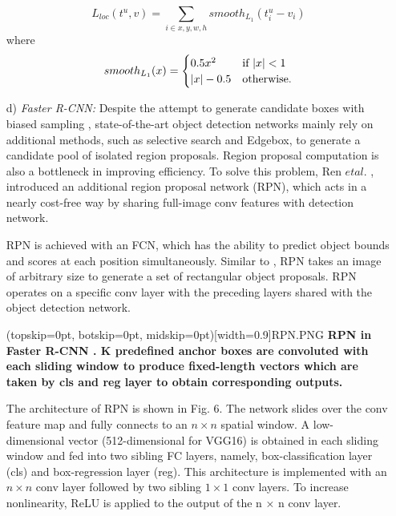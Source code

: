 \documentclass[two column]{ieeeaccess}
\begin{document}
\begin{itemize}
    \begin{equation}
    \label{eqn2}
    L_{loc}(t^u,v) = \sum_{i\in x,y,w,h} smooth_{L_1}(t^u_i - v_i)
    \end{equation}
    where
    \begin{equation}
    \label{eqn3}
    smooth_{L_1}(x) = 
        \begin{cases}
          $$ 0.5x^2 $$ & \text{if } $$ |x| < 1 $$\\
          $$ |x| - 0.5 $$ & \text{otherwise.}
        \end{cases} 
    \end{equation}
    
    \item[d)]\textit{Faster R-CNN: }Despite the attempt to generate candidate boxes with biased sampling \cite{88}, state-of-the-art object detection networks mainly rely on additional methods, such as selective search and Edgebox, to generate a candidate pool of isolated region proposals. Region proposal computation is also a bottleneck in improving efficiency. To solve this problem, Ren $et al$. \cite{17}, \cite{92} introduced an additional region proposal network (RPN), which acts in a nearly cost-free way by sharing full-image conv features with detection network. 
    
    RPN is achieved with an FCN, which has the ability to predict object bounds and scores at each position simultaneously. Similar to \cite{78}, RPN takes an image of arbitrary size to generate a set of rectangular object proposals. RPN operates on a specific conv layer with the preceding layers shared with the object detection network. 
    
    \Figure[ht](topskip=0pt, botskip=0pt, midskip=0pt)[width=0.9\linewidth]{RPN.PNG} {\textbf{RPN in Faster R-CNN \cite{17}. K predefined anchor boxes are convoluted with each sliding window to produce fixed-length vectors which are taken by cls and reg layer to obtain corresponding outputs.}\label{fig6}}
    
    The architecture of RPN is shown in Fig. 6. The network slides over the conv feature map and fully connects to an $n \times n$ spatial window. A low-dimensional vector (512-dimensional for VGG16) is obtained in each sliding window and fed into two sibling FC layers, namely, box-classification layer (cls) and box-regression layer (reg). This architecture is implemented with an $n \times n$ conv layer followed by two sibling $1 \times 1$ conv layers. To increase nonlinearity, ReLU is applied to the output of the n × n conv layer. \\
    

\end{itemize}
\end{document}
